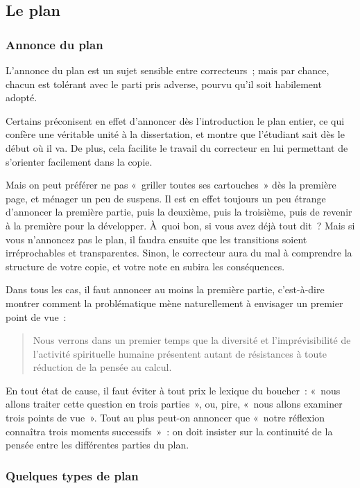 \documentclass[a4paper]{article}
\begin{document}
\subsection{Le plan}
\label{sec-2-4}

\subsubsection{Annonce du plan}
\label{sec-2-4-1}
L'annonce du plan est un sujet sensible entre correcteurs ; mais par
chance, chacun est tolérant avec le parti pris adverse, pourvu qu'il
soit habilement adopté.

Certains préconisent en effet d'annoncer dès l'introduction le plan
entier, ce qui confère une véritable unité à la dissertation, et montre
que l'étudiant sait dès le début où il va. De plus, cela facilite le
travail du correcteur en lui permettant de s'orienter facilement dans la
copie.

Mais on peut préférer ne pas « griller toutes ses cartouches » dès la
première page, et ménager un peu de suspens. Il est en effet toujours un
peu étrange d'annoncer la première partie, puis la deuxième, puis la
troisième, puis de revenir à la première pour la développer. À quoi bon,
si vous avez déjà tout dit ? Mais si vous n'annoncez pas le plan, il
faudra ensuite que les transitions soient irréprochables et
transparentes. Sinon, le correcteur aura du mal à comprendre la
structure de votre copie, et votre note en subira les conséquences.

Dans tous les cas, il faut annoncer au moins la première partie,
c'est-à-dire montrer comment la problématique mène naturellement à
envisager un premier point de vue :

\begin{quote}
Nous verrons dans un premier temps que la diversité et
l'imprévisibilité de l'activité spirituelle humaine présentent autant
de résistances à toute réduction de la pensée au calcul.
\end{quote}

En tout état de cause, il faut éviter à tout prix le lexique du
boucher : « nous allons traiter cette question en trois parties », ou,
pire, « nous allons examiner trois points de vue ». Tout au plus peut-on
annoncer que « notre réflexion connaîtra trois moments successifs » : on
doit insister sur la continuité de la pensée entre les différentes
parties du plan.

\subsubsection{Quelques types de plan}
\label{sec-2-4-2}
\end{document}
